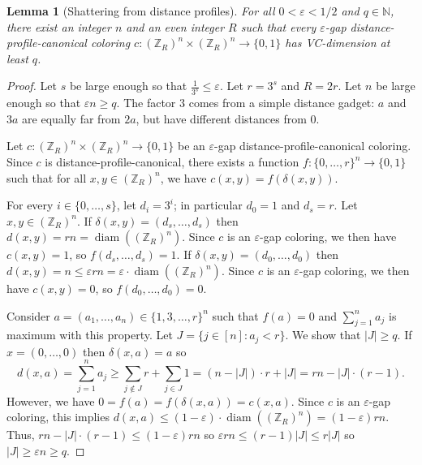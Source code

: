 \documentclass[10pt,a4paper]{amsart}
\DeclareMathOperator{\diam}{diam}
\newtheorem{lemma}[theorem]{Lemma}
\begin{document}
\begin{lemma}[Shattering from distance profiles]\label{lem:large-vc}
    For all $0 < \varepsilon < 1/2$ and $q \in \mathbb{N}$, there exist an integer $n$ and an even integer $R$ such that every $\varepsilon$-gap distance-profile-canonical coloring $c : (\mathbb{Z}_{R})^n \times (\mathbb{Z}_{R})^n \to \{0, 1\}$ has VC-dimension at least $q$.
\end{lemma}

\begin{proof}
    Let $s$ be large enough so that $\frac{1}{3^s} \leq \varepsilon$.
    Let $r = 3^s$ and $R = 2r$.
    Let $n$ be large enough so that $\varepsilon n \geq q$.
    The factor $3$ comes from a simple distance gadget: $a$ and $3a$ are equally far from $2a$, but have different distances from $0$.
    
    Let $c : (\mathbb{Z}_{R})^n \times (\mathbb{Z}_{R})^n \to \{0, 1\}$ be an $\varepsilon$-gap distance-profile-canonical coloring.
    Since $c$ is distance-profile-canonical, there exists a function $f : \{0, \ldots, r\}^n \to \{0, 1\}$ such that for all $x, y \in (\mathbb{Z}_{R})^n$, we have $c(x, y) = f(\delta(x, y))$.
    
    For every $i \in \{0, \ldots, s\}$, let $d_i = 3^i$; in particular $d_0 = 1$ and $d_s = r$.
    Let $x, y \in (\mathbb{Z}_{R})^n$.
    If $\delta(x, y) = (d_s, \ldots, d_s)$ then $d(x, y) = rn = \diam((\mathbb{Z}_{R})^n)$.
    Since $c$ is an $\varepsilon$-gap coloring, we then have $c(x, y) = 1$, so $f(d_s, \ldots, d_s) = 1$.
    If $\delta(x, y) = (d_0, \ldots, d_0)$ then $d(x, y) = n \leq \varepsilon rn = \varepsilon \cdot  \diam((\mathbb{Z}_{R})^n)$.
    Since $c$ is an $\varepsilon$-gap coloring, we then have $c(x, y) = 0$, so $f(d_0, \ldots, d_0) = 0$.
    
    Consider $a = (a_1, \ldots, a_n) \in \{1, 3, \ldots, r\}^n$ such that $f(a) = 0$ and $\sum_{j = 1}^n a_j$ is maximum with this property.
    Let $J = \{j \in [n] : a_j < r\}$.
    We show that $|J| \geq q$.
    If $x = (0, \ldots, 0)$ then $\delta(x, a) = a$ so \[d(x, a) = \sum_{j = 1}^n a_j \geq \sum_{j \notin J}r + \sum_{j \in J}1 = (n-|J|) \cdot r + |J| = rn - |J| \cdot (r-1).\]
    However, we have $0 = f(a) = f(\delta(x, a)) = c(x, a)$. 
    Since $c$ is an $\varepsilon$-gap coloring, this implies $d(x, a) \leq (1-\varepsilon) \cdot \diam((\mathbb{Z}_{R})^n) = (1-\varepsilon)rn$.
    Thus, $rn - |J| \cdot (r-1) \leq (1-\varepsilon)rn$ so $\varepsilon rn \leq (r-1) |J| \leq r|J|$ so $|J| \geq \varepsilon n \geq q$.
    

\end{proof}
\end{document}
